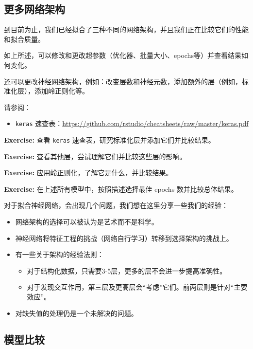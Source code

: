\documentclass[
]{article}
\providecommand{\tightlist}{%
  \setlength{\itemsep}{0pt}\setlength{\parskip}{0pt}}
\begin{document}
\subsection{更多网络架构}\label{ux66f4ux591aux7f51ux7edcux67b6ux6784}

到目前为止，我们已经拟合了三种不同的网络架构，并且我们正在比较它们的性能和拟合质量。

如上所述，可以修改和更改超参数（优化器、批量大小、epochs等）并查看结果如何变化。

还可以更改神经网络架构，例如：改变层数和神经元数，添加额外的层（例如，标准化层），添加岭正则化等。

请参阅：

\begin{itemize}
\tightlist
\item
  \texttt{keras}
  速查表：\url{https://github.com/rstudio/cheatsheets/raw/master/keras.pdf}
\end{itemize}

\textbf{Exercise:} 查看 \texttt{keras}
速查表，研究标准化层并添加它们并比较结果。

\textbf{Exercise:} 查看其他层，尝试理解它们并比较这些层的影响。

\textbf{Exercise:} 应用岭正则化，了解它是什么，并比较结果。

\textbf{Exercise:} 在上述所有模型中，按照描述选择最佳 epochs
数并比较总体结果。

对于拟合神经网络，会出现几个问题，我们想在这里分享一些我们的经验：

\begin{itemize}
\item
  网络架构的选择可以被认为是艺术而不是科学。
\item
  神经网络将特征工程的挑战（网络自行学习）转移到选择架构的挑战上。
\item
  有一些关于架构的经验法则：

  \begin{itemize}
  \tightlist
  \item
    对于结构化数据，只需要3-5层，更多的层不会进一步提高准确性。
  \item
    对于发现交互作用，第三层及更高层会``考虑''它们。前两层则是针对``主要效应''。
  \end{itemize}
\item
  对缺失值的处理仍是一个未解决的问题。
\end{itemize}

\subsection{模型比较}\label{ux6a21ux578bux6bd4ux8f83}
\end{document}
